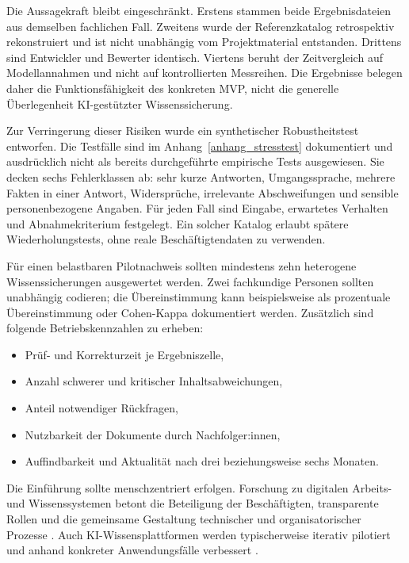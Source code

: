 \documentclass[
  10pt,
  ngerman,
  a4paper,
  toc=graduated,
  numbers=noenddot,
  headings=standardclasses
]{scrartcl}
\begin{document}
Die Aussagekraft bleibt eingeschränkt. Erstens stammen beide Ergebnisdateien aus demselben fachlichen Fall. Zweitens wurde der Referenzkatalog retrospektiv rekonstruiert und ist nicht unabhängig vom Projektmaterial entstanden. Drittens sind Entwickler und Bewerter identisch. Viertens beruht der Zeitvergleich auf Modellannahmen und nicht auf kontrollierten Messreihen. Die Ergebnisse belegen daher die Funktionsfähigkeit des konkreten MVP, nicht die generelle Überlegenheit KI-gestützter Wissenssicherung.

Zur Verringerung dieser Risiken wurde ein synthetischer Robustheitstest entworfen. Die Testfälle sind im Anhang~\ref{anhang_stresstest} dokumentiert und ausdrücklich nicht als bereits durchgeführte empirische Tests ausgewiesen. Sie decken sechs Fehlerklassen ab: sehr kurze Antworten, Umgangssprache, mehrere Fakten in einer Antwort, Widersprüche, irrelevante Abschweifungen und sensible personenbezogene Angaben. Für jeden Fall sind Eingabe, erwartetes Verhalten und Abnahmekriterium festgelegt. Ein solcher Katalog erlaubt spätere Wiederholungstests, ohne reale Beschäftigtendaten zu verwenden.

Für einen belastbaren Pilotnachweis sollten mindestens zehn heterogene Wissenssicherungen ausgewertet werden. Zwei fachkundige Personen sollten unabhängig codieren; die Übereinstimmung kann beispielsweise als prozentuale Übereinstimmung oder Cohen-Kappa dokumentiert werden. Zusätzlich sind folgende Betriebskennzahlen zu erheben:

\begin{itemize}
  \item Prüf- und Korrekturzeit je Ergebniszelle,
  \item Anzahl schwerer und kritischer Inhaltsabweichungen,
  \item Anteil notwendiger Rückfragen,
  \item Nutzbarkeit der Dokumente durch Nachfolger:innen,
  \item Auffindbarkeit und Aktualität nach drei beziehungsweise sechs Monaten.
\end{itemize}

Die Einführung sollte menschzentriert erfolgen. Forschung zu digitalen Arbeits- und Wissenssystemen betont die Beteiligung der Beschäftigten, transparente Rollen und die gemeinsame Gestaltung technischer und organisatorischer Prozesse \cite[S.~23--33]{boehme_nedz_2023}. Auch KI-Wissensplattformen werden typischerweise iterativ pilotiert und anhand konkreter Anwendungsfälle verbessert \cite[S.~136--141]{volkens_wissensmanagement_2026}.
\end{document}
